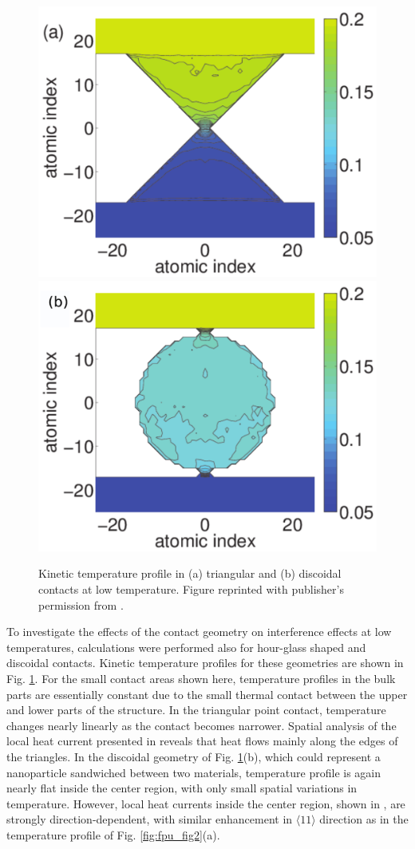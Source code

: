 \begin{figure}
\begin{center}
 \includegraphics[width=.49\columnwidth]{pics/aip_fig5a.pdf}
 \includegraphics[width=.49\columnwidth]{pics/aip_fig6a_mod.pdf}
 \caption{Kinetic temperature profile in (a) triangular and (b) discoidal contacts at low temperature. Figure reprinted with publisher's permission from .}
\label{fig:aip_figs56}
\end{center}
\end{figure}

To investigate the effects of the contact geometry on interference effects at low temperatures, calculations were performed also for hour-glass shaped and discoidal contacts. Kinetic temperature profiles for these geometries are shown in Fig. \ref{fig:aip_figs56}. For the small contact areas shown here, temperature profiles in the bulk parts are essentially constant due to the small thermal contact between the upper and lower parts of the structure. In the triangular point contact, temperature changes nearly linearly as the contact becomes narrower. Spatial analysis of the local heat current presented in  reveals that heat flows mainly along the edges of the triangles. In the discoidal geometry of Fig. \ref{fig:aip_figs56}(b), which could represent a nanoparticle sandwiched between two materials, temperature profile is again nearly flat inside the center region, with only small spatial variations in temperature. However, local heat currents inside the center region, shown in , are strongly direction-dependent, with similar enhancement in $\langle 11\rangle$ direction as in the temperature profile of Fig. \ref{fig:fpu_fig2}(a).


